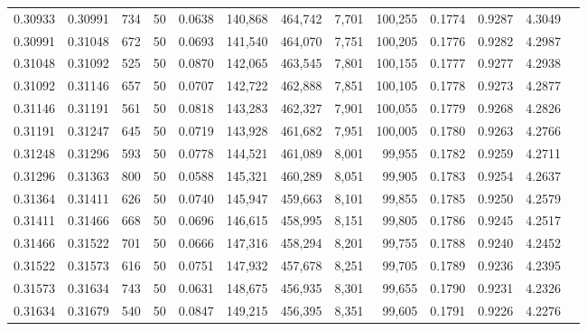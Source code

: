\begin{tabular}{rrrrrrrrrrrrr}
0.30933 & 0.30991 &   734 &  50 &                                     0.0638 & 140,868 & 464,742 &   7,701 & 100,255 & 0.1774 & 0.9287 & 4.3049 \\
0.30991 & 0.31048 &   672 &  50 &                                     0.0693 & 141,540 & 464,070 &   7,751 & 100,205 & 0.1776 & 0.9282 & 4.2987 \\
0.31048 & 0.31092 &   525 &  50 &                                     0.0870 & 142,065 & 463,545 &   7,801 & 100,155 & 0.1777 & 0.9277 & 4.2938 \\
0.31092 & 0.31146 &   657 &  50 &                                     0.0707 & 142,722 & 462,888 &   7,851 & 100,105 & 0.1778 & 0.9273 & 4.2877 \\
0.31146 & 0.31191 &   561 &  50 &                                     0.0818 & 143,283 & 462,327 &   7,901 & 100,055 & 0.1779 & 0.9268 & 4.2826 \\
0.31191 & 0.31247 &   645 &  50 &                                     0.0719 & 143,928 & 461,682 &   7,951 & 100,005 & 0.1780 & 0.9263 & 4.2766 \\
0.31248 & 0.31296 &   593 &  50 &                                     0.0778 & 144,521 & 461,089 &   8,001 &  99,955 & 0.1782 & 0.9259 & 4.2711 \\
0.31296 & 0.31363 &   800 &  50 &                                     0.0588 & 145,321 & 460,289 &   8,051 &  99,905 & 0.1783 & 0.9254 & 4.2637 \\
0.31364 & 0.31411 &   626 &  50 &                                     0.0740 & 145,947 & 459,663 &   8,101 &  99,855 & 0.1785 & 0.9250 & 4.2579 \\
0.31411 & 0.31466 &   668 &  50 &                                     0.0696 & 146,615 & 458,995 &   8,151 &  99,805 & 0.1786 & 0.9245 & 4.2517 \\
0.31466 & 0.31522 &   701 &  50 &                                     0.0666 & 147,316 & 458,294 &   8,201 &  99,755 & 0.1788 & 0.9240 & 4.2452 \\
0.31522 & 0.31573 &   616 &  50 &                                     0.0751 & 147,932 & 457,678 &   8,251 &  99,705 & 0.1789 & 0.9236 & 4.2395 \\
0.31573 & 0.31634 &   743 &  50 &                                     0.0631 & 148,675 & 456,935 &   8,301 &  99,655 & 0.1790 & 0.9231 & 4.2326 \\
0.31634 & 0.31679 &   540 &  50 &                                     0.0847 & 149,215 & 456,395 &   8,351 &  99,605 & 0.1791 & 0.9226 & 4.2276 \\

\end{tabular}
